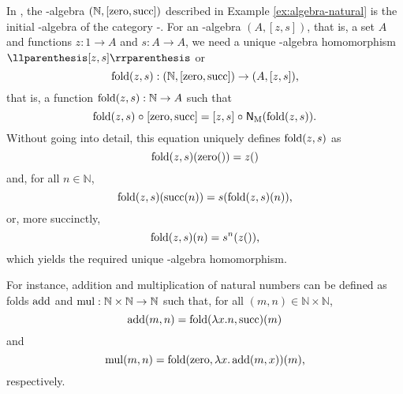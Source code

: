 \begin{example}
  \label{ex:initial-algebra-natural}


  In \set, the -algebra $(\mathbb{N},[\operatorname{zero},\operatorname{succ}])$ described
  in Example \ref{ex:algebra-natural} is the initial -algebra
  of the category -\alg. For an -algebra $(A,[z,s])$,
  that is, a set $A$ and functions $z: 1 \to A$ and $s: A \to A$, we
  need a unique -algebra homomorphism $\cata{[z,s]}$ or
  \begin{equation*}
    \operatorname{fold}(z,s): (\mathbb{N},[\operatorname{zero},\operatorname{succ}]) \to (A,[z,s])
    \text{,}
  \end{equation*}
  that is, a function $\operatorname{fold}(z,s): \mathbb{N} \to A$ such that
  \begin{equation*}
    \operatorname{fold}(z,s) \mathrel{\circ} [\operatorname{zero},\operatorname{succ}] = [z,s] \mathrel{\circ} \mathsf{N}_{\operatorname{M}}(\operatorname{fold}(z,s))
    \text{.}
  \end{equation*}
  Without going into detail, this equation uniquely defines
  $\operatorname{fold}(z,s)$ as
  \begin{equation*}
    \operatorname{fold}(z,s)(\operatorname{zero}()) = z()
  \end{equation*}
  and, for all $n \in \mathbb{N}$,
  \begin{equation*}
    \operatorname{fold}(z,s)(\operatorname{succ}(n)) = s(\operatorname{fold}(z,s)(n))
    \text{,}
  \end{equation*}
  or, more succinctly,
  \begin{equation*}
    \operatorname{fold}(z,s)(n) = s^{n}(z())
    \text{,}
  \end{equation*}
  which yields the required unique -algebra homomorphism.

  For instance, addition and multiplication of natural numbers can be
  defined as folds $\operatorname{add}$ and $\operatorname{mul}: \mathbb{N} \times \mathbb{N} \to
  \mathbb{N}$ such that, for all $(m,n) \in \mathbb{N} \times
  \mathbb{N}$,
  \begin{equation*}
    \operatorname{add}(m,n) = \operatorname{fold}(\lambda x.n,\operatorname{succ})(m)
  \end{equation*}
  and
  \begin{equation*}
    \operatorname{mul}(m,n) = \operatorname{fold}(\operatorname{zero},\lambda x.\operatorname{add}(m,x))(m)
    \text{,}
  \end{equation*}
  respectively.

\end{example}

